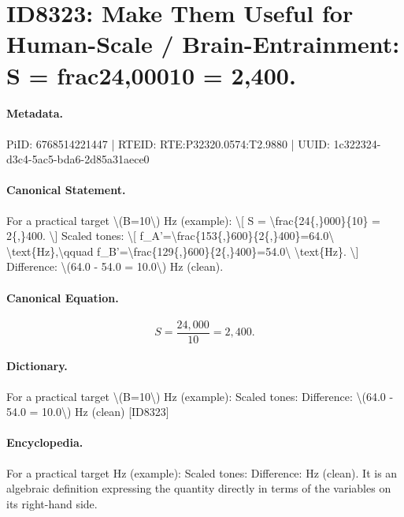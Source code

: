 \section*{ID8323: Make Them Useful for Human-Scale / Brain-Entrainment: S = frac24,00010 = 2,400.}
\paragraph{Metadata.}
PiID: 6768514221447 | RTEID: RTE:P32320.0574:T2.9880 | UUID: 1c322324-d3c4-5ac5-bda6-2d85a31aece0

\paragraph{Canonical Statement.}
For a practical target \textbackslash{}(B=10\textbackslash{}) Hz (example): \textbackslash{}[ S = \textbackslash{}frac\{24\{,\}000\}\{10\} = 2\{,\}400. \textbackslash{}] Scaled tones: \textbackslash{}[ f\_A'=\textbackslash{}frac\{153\{,\}600\}\{2\{,\}400\}=64.0\textbackslash{} \textbackslash{}text\{Hz\},\textbackslash{}qquad f\_B'=\textbackslash{}frac\{129\{,\}600\}\{2\{,\}400\}=54.0\textbackslash{} \textbackslash{}text\{Hz\}. \textbackslash{}] Difference: \textbackslash{}(64.0 - 54.0 = 10.0\textbackslash{}) Hz (clean).

\paragraph{Canonical Equation.}
\[
S = \frac{24{,}000}{10} = 2{,}400.
\]

\paragraph{Dictionary.}
For a practical target \textbackslash{}(B=10\textbackslash{}) Hz (example): Scaled tones: Difference: \textbackslash{}(64.0 - 54.0 = 10.0\textbackslash{}) Hz (clean) [ID8323]

\paragraph{Encyclopedia.}
For a practical target Hz (example): Scaled tones: Difference: Hz (clean). It is an algebraic definition expressing the quantity directly in terms of the variables on its right-hand side.

